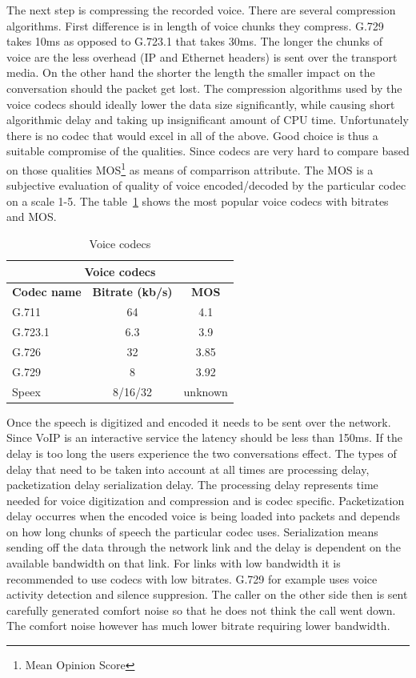 The next step is compressing the recorded voice. There are several compression algorithms. First difference is in length of voice chunks they compress. G.729 takes 10ms as opposed to G.723.1 that takes 30ms. The longer the chunks of voice are the less overhead (IP and Ethernet headers) is sent over the transport media. On the other hand the shorter the length the smaller impact on the conversation should the packet get lost. The compression algorithms used by the voice codecs should ideally lower the data size significantly, while causing short algorithmic delay and taking up insignificant amount of CPU time. Unfortunately there is no codec that would excel in all of the above. Good choice is thus a suitable compromise of the qualities. Since codecs are very hard to compare based on those qualities MOS\footnote{Mean Opinion Score} as means of comparrison attribute. The MOS is a subjective evaluation of quality of voice encoded/decoded by the particular codec on a scale 1-5. The table~\ref{tab:voipCodecs} shows the most popular voice codecs with bitrates and MOS. 

\begin{table}
\begin{center}
\begin{tabular}{|l|c|c|}
	\hline
	\multicolumn{3}{|c|}{\textbf{Voice codecs}}	\\
	\hline
		\textbf{Codec name} & \textbf{Bitrate (kb/s)} & \textbf{MOS} \\
	\hline
	G.711	& 64 & 4.1 \\
	\hline
	G.723.1 & 6.3 & 3.9 \\
	\hline
	G.726 & 32 & 3.85 \\ 
	\hline
	G.729 & 8  & 3.92 \\ 
	\hline
	Speex	& 8/16/32 & unknown \\
	\hline	
\end{tabular}
\end{center}
\label{tab:voipCodecs}
\caption{Voice codecs\cite{voiceCodecs}}
\end{table}

Once the speech is digitized and encoded it needs to be sent over the network. Since VoIP is an interactive service the latency should be less than 150ms. If the delay is too long the users experience the two conversations effect. The types of delay that need to be taken into account at all times are processing delay, packetization delay serialization delay. The processing delay represents time needed for voice digitization and compression and is codec specific. Packetization delay occurres when the encoded voice is being loaded into packets and depends on how long chunks of speech the particular codec uses. Serialization means sending off the data through the network link and the delay is dependent on the available bandwidth on that link. For links with low bandwidth it is recommended to use codecs with low bitrates. G.729 for example uses voice activity detection and silence suppresion. The caller on the other side then is sent carefully generated comfort noise so that he does not think the call went down. The comfort noise however has much lower bitrate requiring lower bandwidth.

